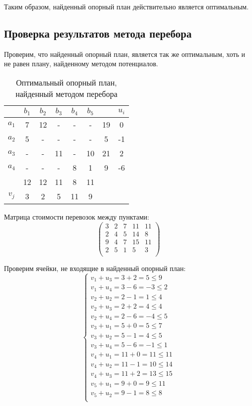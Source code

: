 \documentclass[../body.tex]{subfiles}
\begin{document}
Таким образом, найденный опорный план действительно является оптимальным.

\subsection{Проверка результатов метода перебора}
Проверим, что найденный опорный план, является так же оптимальным, хоть и не равен плану, найденному методом потенциалов.
\begin{table}[h]
    \centering
    \begin{tabular}{|c|c|c|c|c|c||c||c|}
        \hline
        & $b_1$ & $b_2$ & $b_3$ & $b_4$ & $b_5$ & & $u_i$ \\\hline
        $a_1$ & 7 & 12 & - & - & - & 19 & 0\\\hline
        $a_2$ & 5 & - & - & - & - & 5 & -1\\\hline
        $a_3$ & - & - & 11 & - & 10 & 21 & 2\\\hline
        $a_4$ & - & - & - & 8 & 1 & 9 & -6\\\hline
        & 12 & 12 & 11 & 8 & 11 & &\\\hline
        \hline
        $v_j$ & 3 & 2 & 5 & 11 & 9 & &\\\hline
    \end{tabular}
    \caption{Оптимальный опорный план, найденный методом перебора}
    \label{tab:potentials}
\end{table}

Матрица стоимости перевозок между пунктами:
$$\begin{pmatrix}
    3 & 2 & 7 & 11 & 11\\
    2 & 4 & 5 & 14 & 8\\
    9 & 4 & 7 & 15 & 11\\
    2 & 5 & 1 & 5 & 3\\
\end{pmatrix}$$

Проверим ячейки, не входящие в найденный опорный план:
\begin{equation}
    \left\{
    \begin{array}{ll}
         v_1 + u_3 = 3 + 2 = 5 \leq 9\\
         v_1 + u_4 = 3 - 6 = -3 \leq 2\\ 
         v_2 + u_2 = 2 - 1 = 1 \leq 4\\
         v_2 + u_3 = 2 + 2 = 4 \leq 4\\
         v_2 + u_4 = 2 - 6 = -4 \leq 5\\
         v_3 + u_1 = 5 + 0 = 5 \leq 7\\
         v_3 + u_2 = 5 - 1 = 4 \leq 5\\
         v_3 + u_4 = 5 - 6 = -1 \leq 1\\
         v_4 + u_1 = 11 + 0 = 11 \leq 11\\
         v_4 + u_2 = 11 - 1 = 10 \leq 14\\
         v_4 + u_3 = 11 + 2 = 13 \leq 15\\
         v_5 + u_1 = 9 + 0 = 9 \leq 11\\
         v_5 + u_2 = 9 - 1 = 8 \leq 8\\
    \end{array}
    \right.
\end{equation}
\end{document}
